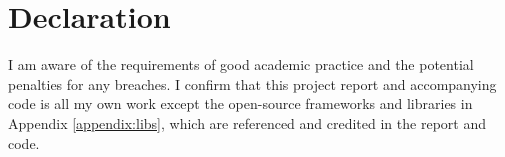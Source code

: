 \chapter*{Declaration}
I am aware of the requirements of good academic practice and the potential penalties for any breaches. I confirm that this project report and accompanying code is all my own work except the open-source frameworks and libraries in Appendix \ref{appendix:libs}, which are referenced and credited in the report and code.